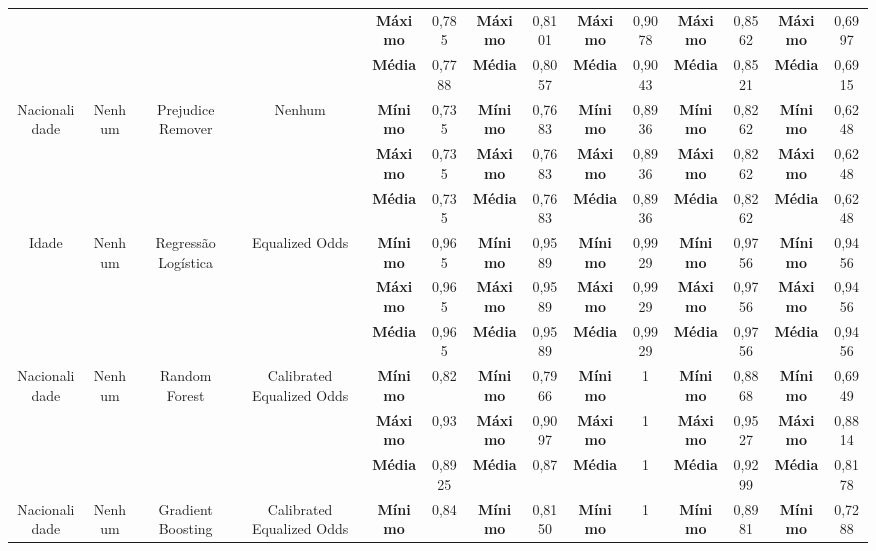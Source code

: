 \documentclass[portugues]{ic-tese}
\begin{document}
\begin{table}[H]
\begin{center}
{\begin{tabular}{c|c|c|c|c|c|c|c|c|c|c|c|c|c}
             & & & & \textbf{Máximo} & 0,785 & \textbf{Máximo} & 0,8101 & \textbf{Máximo} & 0,9078 & \textbf{Máximo} & 0,8562 & \textbf{Máximo} & 0,6997 \\
             & & & & \textbf{Média} & 0,7788 & \textbf{Média} & 0,8057 & \textbf{Média} & 0,9043 & \textbf{Média} & 0,8521 & \textbf{Média} & 0,6915 \\
            \hline
            \multirow{3}{*}{Nacionalidade} & \multirow{3}{*}{Nenhum} & \multirow{3}{*}{Prejudice Remover} & \multirow{3}{*}{Nenhum} & \textbf{Mínimo} & 0,735 & \textbf{Mínimo} & 0,7683 & \textbf{Mínimo} & 0,8936 & \textbf{Mínimo} & 0,8262 & \textbf{Mínimo} & 0,6248 \\
             & & & & \textbf{Máximo} & 0,735 & \textbf{Máximo} & 0,7683 & \textbf{Máximo} & 0,8936 & \textbf{Máximo} & 0,8262 & \textbf{Máximo} & 0,6248 \\
             & & & & \textbf{Média} & 0,735 & \textbf{Média} & 0,7683 & \textbf{Média} & 0,8936 & \textbf{Média} & 0,8262 & \textbf{Média} & 0,6248 \\
            \hline
            \multirow{3}{*}{Idade} & \multirow{3}{*}{Nenhum} & \multirow{3}{*}{Regressão Logística} & \multirow{3}{*}{Equalized Odds} & \textbf{Mínimo} & 0,965 & \textbf{Mínimo} & 0,9589 & \textbf{Mínimo} & 0,9929 & \textbf{Mínimo} & 0,9756 & \textbf{Mínimo} & 0,9456 \\
             & & & & \textbf{Máximo} & 0,965 & \textbf{Máximo} & 0,9589 & \textbf{Máximo} & 0,9929 & \textbf{Máximo} & 0,9756 & \textbf{Máximo} & 0,9456 \\
             & & & & \textbf{Média} & 0,965 & \textbf{Média} & 0,9589 & \textbf{Média} & 0,9929 & \textbf{Média} & 0,9756 & \textbf{Média} & 0,9456 \\
            \hline
            \multirow{3}{*}{Nacionalidade} & \multirow{3}{*}{Nenhum} & \multirow{3}{*}{Random Forest} & \multirow{3}{*}{Calibrated Equalized Odds} & \textbf{Mínimo} & 0,82 & \textbf{Mínimo} & 0,7966 & \textbf{Mínimo} & 1 & \textbf{Mínimo} & 0,8868 & \textbf{Mínimo} & 0,6949 \\
             & & & & \textbf{Máximo} & 0,93 & \textbf{Máximo} & 0,9097 & \textbf{Máximo} & 1 & \textbf{Máximo} & 0,9527 & \textbf{Máximo} & 0,8814 \\
             & & & & \textbf{Média} & 0,8925 & \textbf{Média} & 0,87 & \textbf{Média} & 1 & \textbf{Média} & 0,9299 & \textbf{Média} & 0,8178 \\
            \hline
            \multirow{3}{*}{Nacionalidade} & \multirow{3}{*}{Nenhum} & \multirow{3}{*}{Gradient Boosting} & \multirow{3}{*}{Calibrated Equalized Odds} & \textbf{Mínimo} & 0,84 & \textbf{Mínimo} & 0,8150 & \textbf{Mínimo} & 1 & \textbf{Mínimo} & 0,8981 & \textbf{Mínimo} & 0,7288 \\

\end{tabular}}
\end{center}
\end{table}
\end{document}

